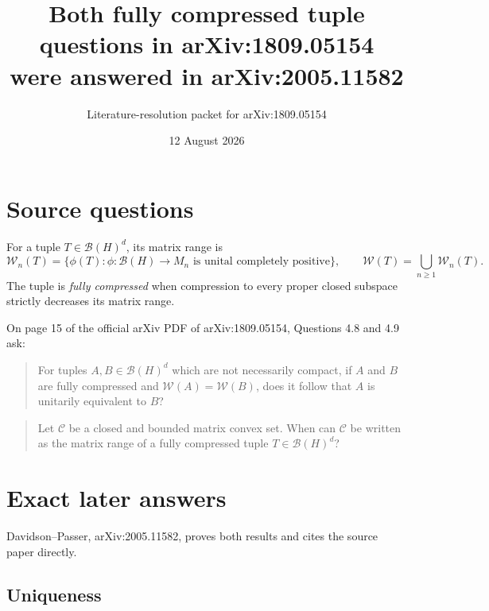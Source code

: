 \documentclass[11pt]{article}
\title{Both fully compressed tuple questions in arXiv:1809.05154\\
were answered in arXiv:2005.11582}
\author{Literature-resolution packet for arXiv:1809.05154}
\date{12 August 2026}
\newcommand{\cW}{\mathcal W}
\newcommand{\cC}{\mathcal C}
\newcommand{\B}{\mathcal B}
\begin{document}
\maketitle

\begin{center}
\end{center}

\section{Source questions}

For a tuple $T\in\B(H)^d$, its matrix range is
\[
  \cW_n(T)=\{\phi(T):\phi:\B(H)\to M_n\text{ is unital completely positive}\},
  \qquad \cW(T)=\bigcup_{n\geq1}\cW_n(T).
\]
The tuple is \emph{fully compressed} when compression to every proper closed
subspace strictly decreases its matrix range.

On page 15 of the official arXiv PDF of arXiv:1809.05154, Questions 4.8 and
4.9 ask:

\begin{quote}
For tuples $A,B\in\B(H)^d$ which are not necessarily compact, if $A$ and $B$
are fully compressed and $\cW(A)=\cW(B)$, does it follow that $A$ is unitarily
equivalent to $B$?
\end{quote}

\begin{quote}
Let $\cC$ be a closed and bounded matrix convex set. When can $\cC$ be written
as the matrix range of a fully compressed tuple $T\in\B(H)^d$?
\end{quote}

\section{Exact later answers}

Davidson--Passer, arXiv:2005.11582, proves both results and cites the source
paper directly.

\subsection*{Uniqueness}
\end{document}
